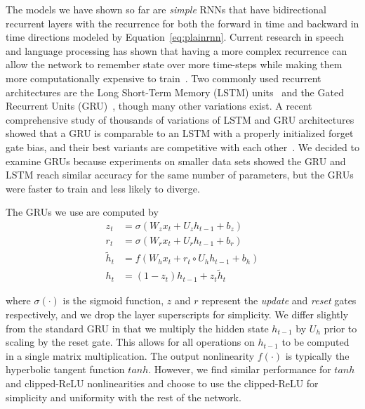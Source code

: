 \documentclass{article}
\begin{document}
The models we have shown so far are \emph{simple} RNNs that have bidirectional recurrent layers with the recurrence for both the forward in time and backward in time directions modeled by Equation~\ref{eq:plainrnn}. Current research in speech and language processing has shown that having a more complex recurrence can allow the network to remember state over more time-steps while making them more computationally expensive to train~\cite{sainath2015, chan2015, sutskever2014seq, bahdanau2015}. Two commonly used recurrent architectures are the Long Short-Term Memory (LSTM) units~\cite{hochreiter1997lstm} and the Gated Recurrent Units (GRU)~\cite{cho2014}, though many other variations exist. A recent comprehensive study of thousands of variations of LSTM and GRU architectures showed that a GRU is comparable to an LSTM with a properly initialized forget gate bias, and their best variants are competitive with each other~\cite{jozefowicz2015}. We decided to examine GRUs because experiments on smaller data sets showed the GRU and LSTM reach similar accuracy for the same number of parameters, but the GRUs were faster to train and less likely to diverge. 

The GRUs we use are computed by 
\begin{equation}
\begin{aligned}
z_t &= \sigma(W_z x_t + U_z h_{t-1} + b_z) \\
r_t &= \sigma(W_r x_t + U_r h_{t-1} + b_r) \\
\tilde{h}_t &= f(W_h x_t + r_t \circ U_h h_{t-1} + b_h) \\
h_t &= (1 - z_t) h_{t-1} + z_t \tilde{h}_t
\end{aligned}
\end{equation}

where $\sigma(\cdot)$ is the sigmoid function, $z$ and $r$ represent the \emph{update} and \emph{reset} gates respectively, and we drop the layer superscripts for simplicity. We differ slightly from the standard GRU in that we multiply the hidden state $h_{t-1}$ by $U_h$ prior to scaling by the reset gate. This allows for all operations on $h_{t-1}$ to be computed in a single matrix multiplication. The output nonlinearity $f(\cdot)$ is typically the hyperbolic tangent function $tanh$. However, we find similar performance for $tanh$ and clipped-ReLU nonlinearities and choose to use the clipped-ReLU for simplicity and uniformity with the rest of the network.
\end{document}
